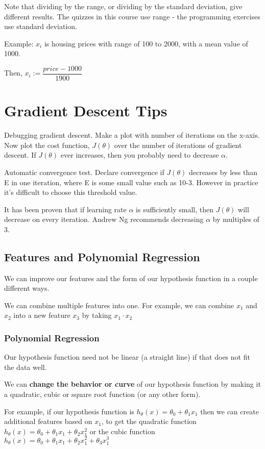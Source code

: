 Note that dividing by the range, or dividing by the standard deviation, give different results. The quizzes in this course use range - the programming exercises use standard deviation.

Example: $x_i$ is housing prices with range of 100 to 2000, with a mean value of 1000. 

Then, $x_i := \dfrac{price-1000}{1900} $
\section*{Gradient Descent Tips}
Debugging gradient descent. Make a plot with number of iterations on the x-axis. Now plot the cost function, $J(\theta)$ over the number of iterations of gradient descent. If $J(\theta)$ ever increases, then you probably need to decrease $\alpha$.

Automatic convergence test. Declare convergence if $J(\theta)$ decreases by less than E in one iteration, where E is some small value such as 10-3. However in practice it's difficult to choose this threshold value.

It has been proven that if learning rate $\alpha$ is sufficiently small, then $J(\theta)$ will decrease on every iteration. Andrew Ng recommends decreasing $\alpha$ by multiples of 3.
\subsection*{Features and Polynomial Regression}
We can improve our features and the form of our hypothesis function in a couple different ways.

We can combine multiple features into one. For example, we can combine $x_1$ and $x_2$ into a new feature $x_3$ by taking $x_1\cdot x_2$
\subsubsection*{Polynomial Regression}
Our hypothesis function need not be linear (a straight line) if that does not fit the data well.

We can {\bf change the behavior or curve} of our hypothesis function by making it a quadratic, cubic or square root function (or any other form).

For example, if our hypothesis function is $h_\theta(x) = \theta_0 + \theta_1 x_1$ then we can create additional features based on $x_1$, to get the quadratic function $h_\theta(x) = \theta_0 + \theta_1 x_1 + \theta_2 x_1^2$ or the cubic function $h_\theta(x) = \theta_0 + \theta_1 x_1 + \theta_2 x_1^2 + \theta_3 x_1^3$ 

